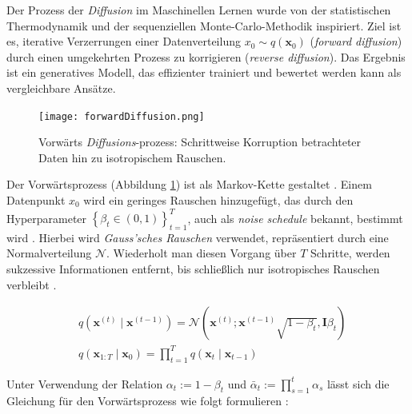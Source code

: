 \documentclass[
  a4paper,  %
  twoside,  %
  bibliography=totoc,
  headsepline,
  cleardoublepage=empty,
  parskip=half,
  draft=false
]{scrbook}
\begin{document}
{Der Prozess der \emph{Diffusion} im Maschinellen Lernen \cite{sohl-dickstein_deep_2015, ho_denoising_2020, nichol_improved_2021, dhariwal_diffusion_2021} wurde von der statistischen Thermodynamik \cite{jarzynski_equilibrium_1997} und der sequenziellen Monte-Carlo-Methodik \cite{neal_annealed_1998} inspiriert. Ziel ist es, iterative Verzerrungen einer Datenverteilung $x_0\sim q(\mathbf{x}_0)$ (\emph{forward diffusion}) durch einen umgekehrten Prozess zu korrigieren (\emph{reverse diffusion}). Das Ergebnis ist ein generatives Modell, das effizienter trainiert und bewertet werden kann als vergleichbare Ansätze. \cite{sohl-dickstein_deep_2015, nichol_improved_2021}

\begin{figure}[h]
  \centering
  \texttt{[image: forwardDiffusion.png]}
  \caption[Vorwärtsprozess Diffusion]{Vorwärts \emph{Diffusions}-prozess: Schrittweise Korruption betrachteter Daten hin zu isotropischem Rauschen. \cite{machine_learning_at_berkeley_diffusion_2022}}
  \label{fig:forwardDiffusion}
\end{figure} 

Der Vorwärtsprozess (Abbildung \ref{fig:forwardDiffusion}) ist als Markov-Kette gestaltet \cite{sohl-dickstein_deep_2015, ho_denoising_2020}. Einem Datenpunkt $x_0$ wird ein geringes Rauschen hinzugefügt, das durch den Hyperparameter $\left\{\beta_t \in(0,1)\right\}_{t=1}^T$, auch als \emph{noise schedule} bekannt, bestimmt wird \cite{ho_denoising_2020, machine_learning_at_berkeley_diffusion_2022}. Hierbei wird \emph{Gauss'sches Rauschen} \cite{shannon_communication_1949} verwendet, repräsentiert durch eine Normalverteilung $\mathcal{N}$. Wiederholt man diesen Vorgang über $T$ Schritte, werden sukzessive Informationen entfernt, bis schließlich nur isotropisches Rauschen verbleibt \cite{machine_learning_at_berkeley_diffusion_2022}.

\begin{align}
   & q\left(\mathbf{x}^{(t)} \mid \mathbf{x}^{(t-1)}\right) = \mathcal{N}\left(\mathbf{x}^{(t)} ; \mathbf{x}^{(t-1)} \sqrt{1-\beta_t}, \mathbf{I} \beta_t\right) \\
   & q\left(\mathbf{x}_{1: T} \mid \mathbf{x}_0\right)=\prod_{t=1}^T q\left(\mathbf{x}_t \mid \mathbf{x}_{t-1}\right)
\end{align}

Unter Verwendung der Relation \( \alpha_t:=1-\beta_t \) und \( \bar{\alpha}_t:=\prod_{s=1}^t \alpha_s \) lässt sich die Gleichung für den Vorwärtsprozess wie folgt formulieren \cite{ho_denoising_2020}: 

}
\end{document}
